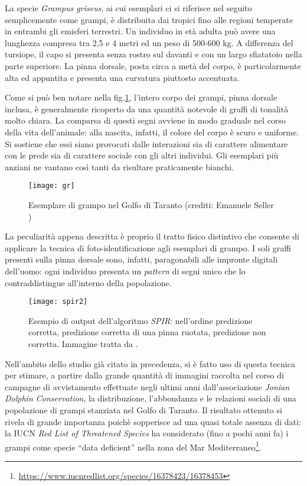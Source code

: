 La specie \textit{Grampus griseus}, ai cui esemplari ci si riferisce nel seguito semplicemente come grampi, è distribuita dai tropici fino alle regioni temperate in entrambi gli emisferi terrestri. Un individuo in età adulta può avere una lunghezza compresa tra 2,5 e 4 metri ed un peso di 500-600 kg. A differenza del tursiope, il capo si presenta senza rostro sul davanti e con un largo sfiatatoio nella parte superiore. La pinna dorsale, posta circa a metà del corpo, è particolarmente alta ed appuntita e presenta una curvatura piuttosto accentuata.

Come si può ben notare nella fig.\ref{fig:grampo}, l'intero corpo dei grampi, pinna dorsale inclusa, è generalmente ricoperto da una quantità notevole di graffi di tonalità molto chiara. La comparsa di questi segni avviene in modo graduale nel corso della vita dell'animale: alla nascita, infatti, il colore del corpo è scuro e uniforme. Si sostiene che essi siano provocati dalle interazioni sia di carattere alimentare con le prede sia di carattere sociale con gli altri individui. Gli esemplari più anziani ne vantano così tanti da risultare praticamente bianchi.

\begin{figure}[h!]
	\centering
	\texttt{[image: gr]}
	\caption{Esemplare di grampo nel Golfo di Taranto (crediti: Emanuele Seller \cite{emanuele})}
	\label{fig:grampo}
\end{figure}

La peculiarità appena descritta è proprio il tratto fisico distintivo che consente di applicare la tecnica di foto-identificazione agli esemplari di grampo. I soli graffi presenti sulla pinna dorsale sono, infatti, paragonabili alle impronte digitali dell'uomo: ogni individuo presenta un \textit{pattern} di segni unico che lo contraddistingue all'interno della popolazione.

\begin{figure}[h!]
	\centering
	\texttt{[image: spir2]}
	\caption{Esempio di output dell'algoritmo \textit{SPIR}: nell'ordine predizione corretta, predizione corretta di una pinna ruotata, predizione non corretta. Immagine tratta da \cite{maglietta}.}
	\label{fig:dalpaper}
\end{figure}

Nell'ambito dello studio \cite{maglietta} già citato in precedenza, si è fatto uso di questa tecnica per stimare, a partire dalla grande quantità di immagini raccolta nel corso di campagne di avvistamento effettuate negli ultimi anni dall'associazione \textit{Jonian Dolphin Conservation}, la distribuzione, l'abbondanza e le relazioni sociali di una popolazione di grampi stanziata nel Golfo di Taranto.
Il risultato ottenuto si rivela di grande importanza poichè sopperisce ad una quasi totale assenza di dati: la IUCN \textit{Red List of Threatened Species} ha considerato (fino a pochi anni fa) i grampi come specie “data deficient” nella zona del Mar Mediterraneo\footnote{\url{https://www.iucnredlist.org/species/16378423/16378453}}.\\

